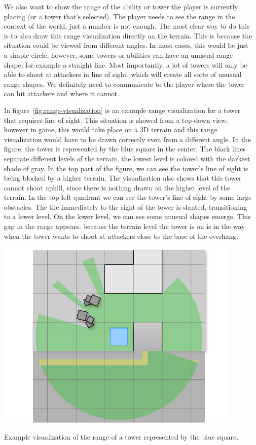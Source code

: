 We also want to show the range of the ability or tower the player is currently placing (or a tower that's selected).
The player needs to see the range in the context of the world, just a number is not enough.
The most clear way to do this is to also draw this range visualization directly on the terrain.
This is because the situation could be viewed from different angles.
In most cases, this would be just a simple circle, however, some towers or abilities can have an unusual range shape, for example a straight line.
Most importantly, a lot of towers will only be able to shoot at attackers in line of sight, which will create all sorts of unusual range shapes.
We definitely need to communicate to the player where the tower can hit attackers and where it cannot.

In figure~\ref{fig:range-visualization} is an example range visualization for a tower that requires line of sight.
This situation is showed from a top-down view, however in game, this would take place on a 3D terrain and this range visualization would have to be drawn correctly even from a different angle.
In the figure, the tower is represented by the blue square in the center.
The black lines separate different levels of the terrain, the lowest level is colored with the darkest shade of gray.
In the top part of the figure, we can see the tower's line of sight is being blocked by a higher terrain.
The visualization also shows that this tower cannot shoot uphill, since there is nothing drawn on the higher level of the terrain.
In the top left quadrant we can see the tower's line of sight by some large obstacles.
The tile immediately to the right of the tower is slanted, transitioning to a lower level.
On the lower level, we can see some unusual shapes emerge.
This gap in the range appears, because the terrain level the tower is on is in the way when the tower wants to shoot at attackers close to the base of the overhang.

\begin{center}
    \captionsetup{type=figure}
    \includegraphics[width=0.9\textwidth]{img/Range visualisation.pdf}
    \caption{Example visualization of the range of a tower represented by the blue square.}
    \label{fig:range-visualization}
\end{center}

